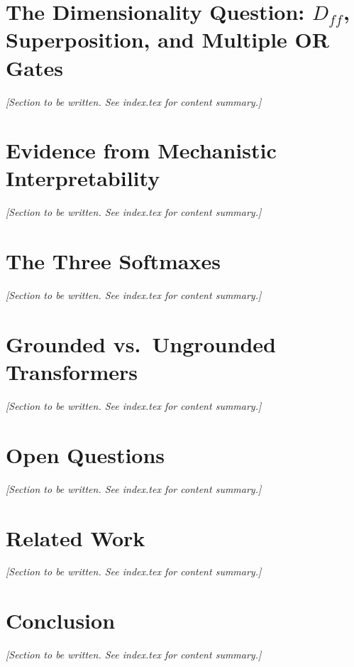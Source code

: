 \documentclass[11pt,letterpaper]{article}
\begin{document}
\section{The Dimensionality Question: $D_{ff}$, Superposition, and Multiple OR Gates}
\textit{[Section to be written. See index.tex for content summary.]}

\section{Evidence from Mechanistic Interpretability}
\textit{[Section to be written. See index.tex for content summary.]}

\section{The Three Softmaxes}
\textit{[Section to be written. See index.tex for content summary.]}

\section{Grounded vs.\ Ungrounded Transformers}
\textit{[Section to be written. See index.tex for content summary.]}

\section{Open Questions}
\textit{[Section to be written. See index.tex for content summary.]}

\section{Related Work}
\textit{[Section to be written. See index.tex for content summary.]}

\section{Conclusion}
\textit{[Section to be written. See index.tex for content summary.]}



\end{document}

